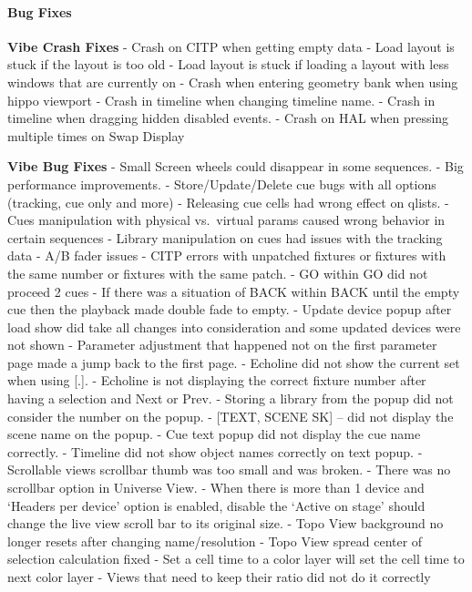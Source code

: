 \documentclass[
]{article}
\begin{document}
\hypertarget{bug-fixes-3}{%
\paragraph{Bug Fixes}\label{bug-fixes-3}}

\textbf{Vibe Crash Fixes}
- Crash on CITP when getting empty data
- Load layout is stuck if the layout is too old
- Load layout is stuck if loading a layout with less windows that are currently on
- Crash when entering geometry bank when using hippo viewport
- Crash in timeline when changing timeline name.
- Crash in timeline when dragging hidden disabled events.
- Crash on HAL when pressing multiple times on Swap Display

\textbf{Vibe Bug Fixes}
- Small Screen wheels could disappear in some sequences.
- Big performance improvements.
- Store/Update/Delete cue bugs with all options (tracking, cue only and more)
- Releasing cue cells had wrong effect on qlists.
- Cues manipulation with physical vs.~virtual params caused wrong behavior in certain sequences
- Library manipulation on cues had issues with the tracking data
- A/B fader issues
- CITP errors with unpatched fixtures or fixtures with the same number or fixtures with the same patch.
- GO within GO did not proceed 2 cues
- If there was a situation of BACK within BACK until the empty cue then the playback made double fade to empty.
- Update device popup after load show did take all changes into consideration and some updated devices were not shown
- Parameter adjustment that happened not on the first parameter page made a jump back to the first page.
- Echoline did not show the current set when using {[}.{]}.
- Echoline is not displaying the correct fixture number after having a selection and Next or Prev.
- Storing a library from the popup did not consider the number on the popup.
- {[}TEXT, SCENE SK{]} -- did not display the scene name on the popup.
- Cue text popup did not display the cue name correctly.
- Timeline did not show object names correctly on text popup.
- Scrollable views scrollbar thumb was too small and was broken.
- There was no scrollbar option in Universe View.
- When there is more than 1 device and `Headers per device' option is enabled, disable the `Active on stage' should change the live view scroll bar to its original size.
- Topo View background no longer resets after changing name/resolution
- Topo View spread center of selection calculation fixed
- Set a cell time to a color layer will set the cell time to next color layer
- Views that need to keep their ratio did not do it correctly
\end{document}
